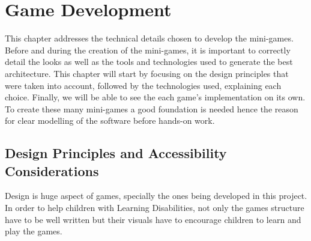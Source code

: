 \raggedbottom

\chapter{Game Development}
\label{cha:game_development}

This chapter addresses the technical details chosen to develop the mini-games. Before and during the creation of the mini-games, it is important to correctly detail the looks as well as the tools and technologies used to generate the best architecture.
This chapter will start by focusing on the design principles that were taken into account, followed by the technologies used, explaining each choice. Finally, we will be able to see the each game's implementation on its own.
To create these many mini-games a good foundation is needed hence the reason for clear modelling of the software before hands-on work.



	


\newpage
\section{Design Principles and Accessibility Considerations}

Design is huge aspect of games, specially the ones being developed in this project. In order to help children with Learning Disabilities, not only the games structure have to be well written but their visuals have to encourage children to learn and play the games.

